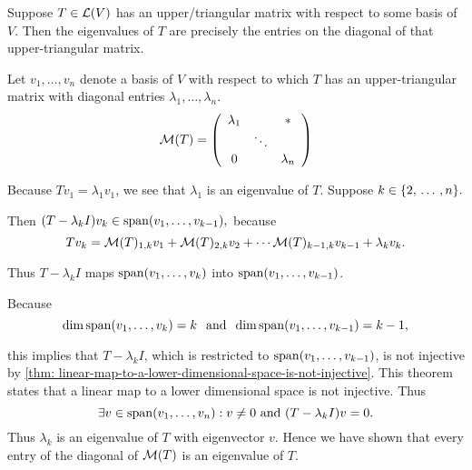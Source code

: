 \begin{thm}
  \label{thm:determination-of-eigenvalue-from-upper-triangular-matrix}
  Suppose $T\in \mathcal{L}(V)$ has an upper\-/triangular matrix with respect to some basis of $V$. Then the eigenvalues of $T$ are precisely the entries on the diagonal of that upper-triangular matrix.

\end{thm}
\begin{prf}
  Let $v_1, \ldots, v_n$ denote a basis of $V$ with respect to which $T$ has an upper-triangular matrix with diagonal entries $\lambda_1, \ldots, \lambda_n$.
  \begin{equation}
    \mathcal{M}(T) =
    \left( {\begin{array}{ccc}
        \lambda_1 &         &  * \\
        &  \ddots &    \\
        0      &         & \lambda_n
    \end{array} } \right)
  \end{equation}

  Because $T v_1 = \lambda_1 v_1$, we see that $\lambda_1$ is an eigenvalue of $T$.
  Suppose $k \in \{2, {\, \ldots \,\,}, n\}.$

  Then $(T-\lambda_k I) v_k \in \operatorname{span} (v_1, \ldots, v_{k-1}),$ because
  \begin{equation}
    T v_k = \mathcal{M}(T)_{1,k} v_1 + \mathcal{M}(T)_{2,k}v_2 + \cdots \mathcal{M}(T)_{k-1,k} v_{k-1} + \lambda_k v_k.
  \end{equation}

  Thus $T-\lambda_k I$ maps $\operatorname{span} (v_1, \ldots, v_k)$ into $\operatorname{span} (v_1, \ldots, v_{k-1})$.

  Because
  \begin{equation}
    \dim \operatorname{span} (v_1, \ldots, v_k) = k \;\;\, \text{and}\;\; \dim \operatorname{span} (v_1, \ldots, v_{k-1}) = k-1,
  \end{equation}

  this implies that $T-\lambda_k I$, which is restricted to $\operatorname{span} (v_1, \ldots, v_{k-1})$, is not injective by \ref{thm: linear-map-to-a-lower-dimensional-space-is-not-injective}. This theorem states that a linear map to a lower dimensional space is not injective. Thus
  \begin{equation}
    \exists v \in \myspan{v_1, \ldots, v_n}: v\neq0$ and $(T-\lambda_k I)v=0.
  \end{equation}
  Thus $\lambda_k$ is an eigenvalue of $T$ with eigenvector $v$. Hence we have shown that every entry of the diagonal of $\mathcal{M}(T)$ is an eigenvalue of $T$.


\end{prf}
